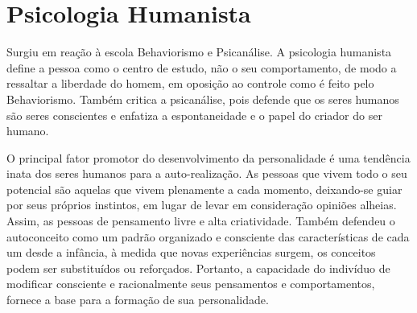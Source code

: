 \newpage
\section{Psicologia Humanista}\label{humanismo}

Surgiu em reação à escola Behaviorismo e Psicanálise. 
A psicologia humanista define a pessoa como o centro de estudo, não o seu comportamento, de modo a ressaltar a liberdade do homem, em oposição ao controle como é feito pelo Behaviorismo.
Também critica a psicanálise, pois defende que os seres humanos são seres conscientes e enfatiza a espontaneidade e o papel do criador do ser humano.

O principal fator promotor do desenvolvimento da personalidade é uma tendência inata dos seres humanos para a auto-realização. 
As pessoas que vivem todo o seu potencial são aquelas que vivem plenamente a cada momento, deixando-se guiar por seus próprios instintos, em lugar de levar em consideração opiniões alheias. 
Assim, as pessoas de pensamento livre e alta criatividade.
Também defendeu o autoconceito como um padrão organizado e consciente das características de cada um desde a infância, à medida que novas experiências surgem, os conceitos podem ser substituídos ou reforçados. 
Portanto, a capacidade do indivíduo de modificar consciente e racionalmente seus pensamentos e comportamentos, fornece a base para a formação de sua personalidade. 
